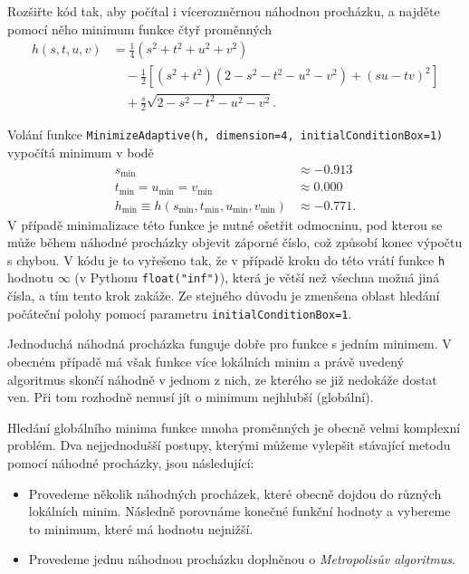 \documentclass[a4paper,11pt,twoside]{article}
\def\code#1{\textnormal{\texttt{#1}}}
\begin{document}
    \begin{task}
        Rozšiřte kód tak, aby počítal i vícerozměrnou náhodnou procházku, a najděte pomocí něho minimum funkce čtyř proměnných
        \begin{align}
            h(s,t,u,v)
                &=\frac{1}{4}\left(s^{2}+t^{2}+u^{2}+v^{2}\right)\nonumber\\
                &\quad-\frac{1}{2}\left[\left(s^{2}+t^{2}\right)\left(2-s^{2}-t^{2}-u^{2}-v^{2}\right)+\left(su-tv\right)^{2}\right]\\
                &\quad+\frac{s}{2}\sqrt{2-s^{2}-t^{2}-u^{2}-v^{2}}\nonumber.
            \end{align}
    \end{task}

    \begin{solution}
        Volání funkce \code{MinimizeAdaptive(h, dimension=4, initialConditionBox=1)} vypočítá minimum v bodě
        \begin{align}
            s_{\text{min}}&\approx-0.913\nonumber\\
            t_{\text{min}}=u_{\text{min}}=v_{\text{min}}&\approx0.000\\
            h_{\text{min}}\equiv h(s_{\text{min}},t_{\text{min}},u_{\text{min}},v_{\text{min}})&\approx-0.771.\nonumber
        \end{align}
        V případě minimalizace této funkce je nutné ošetřit odmocninu, pod kterou se může během náhodné procházky objevit záporné číslo, což způsobí konec výpočtu s chybou.
        V kódu je to vyřešeno tak, že v případě kroku do této  vrátí funkce \code{h} hodnotu $\infty$ (v Pythonu \code{float("inf")}), která je větší než všechna možná jiná čísla, a tím tento krok zakáže.
        Ze stejného důvodu je zmenšena oblast hledání počáteční polohy pomocí parametru \code{initialConditionBox=1}.
    \end{solution}

    Jednoduchá náhodná procházka funguje dobře pro funkce s jedním minimem.
    V obecném případě má však funkce více lokálních minim a právě uvedený algoritmus skončí náhodně v jednom z nich, ze kterého se již nedokáže dostat ven.
    Při tom rozhodně nemusí jít o minimum nejhlubší (globální).
    
    Hledání globálního minima funkce mnoha proměnných je obecně velmi komplexní problém.
    Dva nejjednodušší postupy, kterými můžeme vylepšit stávající metodu pomocí náhodné procházky, jsou následující:
    \begin{itemize}
        \item Provedeme několik náhodných procházek, které obecně dojdou do různých lokálních minim.
            Následně porovnáme konečné funkční hodnoty a vybereme to minimum, které má hodnotu nejnižší.
        \item Provedeme jednu náhodnou procházku doplněnou o \emph{Metropolisův algoritmus}. 
    \end{itemize}
\end{document}
